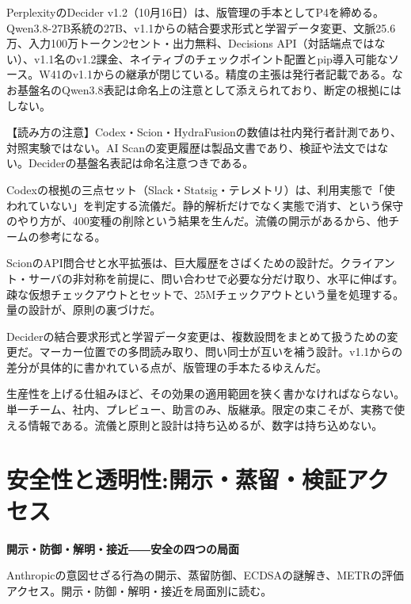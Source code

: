 \documentclass[lualatex,a4paper,10pt]{jlreq}
\begin{document}
PerplexityのDecider v1.2（10月16日）は、版管理の手本としてP4を締める。Qwen3.8-27B系統の27B、v1.1からの結合要求形式と学習データ変更、文脈25.6万、入力100万トークン2セント・出力無料、Decisions API（対話端点ではない）、v1.1名のv1.2課金、ネイティブのチェックポイント配置とpip導入可能なソース。W41のv1.1からの継承が閉じている。精度の主張は発行者記載である。なお基盤名のQwen3.8表記は命名上の注意として添えられており、断定の根拠にはしない。
\cite{B36,B37,B38}


\begin{tcolorbox}[colback=SurveySoft,colframe=SurveyRule,arc=1mm,boxrule=0.4pt,left=2mm,right=2mm]
【読み方の注意】Codex・Scion・HydraFusionの数値は社内発行者計測であり、対照実験ではない。AI Scanの変更履歴は製品文書であり、検証や法文ではない。Deciderの基盤名表記は命名注意つきである。
\end{tcolorbox}
\cite{B31,B36,B33,B34,B35,B37,B38,B32}


Codexの根拠の三点セット（Slack・Statsig・テレメトリ）は、利用実態で「使われていない」を判定する流儀だ。静的解析だけでなく実態で消す、という保守のやり方が、400変種の削除という結果を生んだ。流儀の開示があるから、他チームの参考になる。
\cite{B31}


ScionのAPI問合せと水平拡張は、巨大履歴をさばくための設計だ。クライアント・サーバの非対称を前提に、問い合わせで必要な分だけ取り、水平に伸ばす。疎な仮想チェックアウトとセットで、25Mチェックアウトという量を処理する。量の設計が、原則の裏づけだ。
\cite{B32}


Deciderの結合要求形式と学習データ変更は、複数設問をまとめて扱うための変更だ。マーカー位置での多問読み取り、問い同士が互いを補う設計。v1.1からの差分が具体的に書かれている点が、版管理の手本たるゆえんだ。
\cite{B36,B37,B38}


生産性を上げる仕組みほど、その効果の適用範囲を狭く書かなければならない。単一チーム、社内、プレビュー、助言のみ、版継承。限定の束こそが、実務で使える情報である。流儀と原則と設計は持ち込めるが、数字は持ち込めない。
\cite{B31,B36,B33,B34,B35,B37,B38,B32}


\section{安全性と透明性:開示・蒸留・検証アクセス}
\label{sec:P5}

{\Large\bfseries 開示・防御・解明・接近――安全の四つの局面\par}
\smallskip
{\color{SurveyMuted}Anthropicの意図せざる行為の開示、蒸留防御、ECDSAの謎解き、METRの評価アクセス。開示・防御・解明・接近を局面別に読む。\par}
\bigskip
\end{document}
